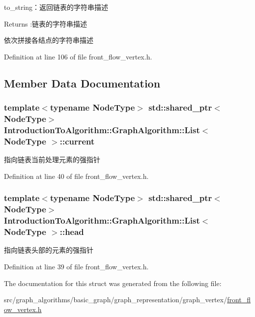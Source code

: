 to\+\_\+string：返回链表的字符串描述 

\begin{DoxyReturn}{Returns}
\+:链表的字符串描述
\end{DoxyReturn}
依次拼接各结点的字符串描述 

Definition at line 106 of file front\+\_\+flow\+\_\+vertex.\+h.



\subsection{Member Data Documentation}
\hypertarget{struct_introduction_to_algorithm_1_1_graph_algorithm_1_1_list_ad321a5c55f1f58c6054b7925ea007f89}{}
\subsubsection[{current}]{\setlength{\rightskip}{0pt plus 5cm}template$<$typename Node\+Type$>$ std\+::shared\+\_\+ptr$<$Node\+Type$>$ {\bf Introduction\+To\+Algorithm\+::\+Graph\+Algorithm\+::\+List}$<$ Node\+Type $>$\+::current}\label{struct_introduction_to_algorithm_1_1_graph_algorithm_1_1_list_ad321a5c55f1f58c6054b7925ea007f89}
指向链表当前处理元素的强指针 

Definition at line 40 of file front\+\_\+flow\+\_\+vertex.\+h.

\hypertarget{struct_introduction_to_algorithm_1_1_graph_algorithm_1_1_list_a78a07f79c1c8133b74f23ec794e0557e}{}
\subsubsection[{head}]{\setlength{\rightskip}{0pt plus 5cm}template$<$typename Node\+Type$>$ std\+::shared\+\_\+ptr$<$Node\+Type$>$ {\bf Introduction\+To\+Algorithm\+::\+Graph\+Algorithm\+::\+List}$<$ Node\+Type $>$\+::head}\label{struct_introduction_to_algorithm_1_1_graph_algorithm_1_1_list_a78a07f79c1c8133b74f23ec794e0557e}
指向链表头部的元素的强指针 

Definition at line 39 of file front\+\_\+flow\+\_\+vertex.\+h.



The documentation for this struct was generated from the following file\+:\begin{DoxyCompactItemize}
\item 
src/graph\+\_\+algorithms/basic\+\_\+graph/graph\+\_\+representation/graph\+\_\+vertex/\hyperlink{front__flow__vertex_8h}{front\+\_\+flow\+\_\+vertex.\+h}\end{DoxyCompactItemize}
